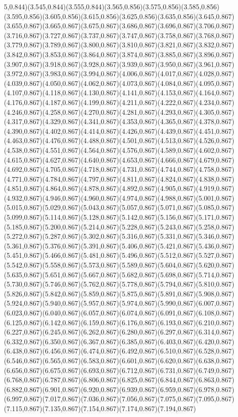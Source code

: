 \documentclass[smallextended]{svjour3}
\begin{document}
5,0.844)(3.545,0.844)(3.555,0.844)(3.565,0.856)(3.575,0.856)(3.585,0.856)(3.595,0.856)(3.605,0.856)(3.615,0.856)(3.625,0.856)(3.635,0.856)(3.645,0.867)(3.655,0.867)(3.665,0.867)(3.675,0.867)(3.686,0.867)(3.696,0.867)(3.706,0.867)(3.716,0.867)(3.727,0.867)(3.737,0.867)(3.747,0.867)(3.758,0.867)(3.768,0.867)(3.779,0.867)(3.789,0.867)(3.800,0.867)(3.810,0.867)(3.821,0.867)(3.832,0.867)(3.842,0.867)(3.853,0.867)(3.864,0.867)(3.874,0.867)(3.885,0.867)(3.896,0.867)(3.907,0.867)(3.918,0.867)(3.928,0.867)(3.939,0.867)(3.950,0.867)(3.961,0.867)(3.972,0.867)(3.983,0.867)(3.994,0.867)(4.006,0.867)(4.017,0.867)(4.028,0.867)(4.039,0.867)(4.050,0.867)(4.062,0.867)(4.073,0.867)(4.084,0.867)(4.095,0.867)(4.107,0.867)(4.118,0.867)(4.130,0.867)(4.141,0.867)(4.153,0.867)(4.164,0.867)(4.176,0.867)(4.187,0.867)(4.199,0.867)(4.211,0.867)(4.222,0.867)(4.234,0.867)(4.246,0.867)(4.258,0.867)(4.270,0.867)(4.281,0.867)(4.293,0.867)(4.305,0.867)(4.317,0.867)(4.329,0.867)(4.341,0.867)(4.353,0.867)(4.365,0.867)(4.378,0.867)(4.390,0.867)(4.402,0.867)(4.414,0.867)(4.426,0.867)(4.439,0.867)(4.451,0.867)(4.463,0.867)(4.476,0.867)(4.488,0.867)(4.501,0.867)(4.513,0.867)(4.526,0.867)(4.538,0.867)(4.551,0.867)(4.564,0.867)(4.576,0.867)(4.589,0.867)(4.602,0.867)(4.615,0.867)(4.627,0.867)(4.640,0.867)(4.653,0.867)(4.666,0.867)(4.679,0.867)(4.692,0.867)(4.705,0.867)(4.718,0.867)(4.731,0.867)(4.744,0.867)(4.758,0.867)(4.771,0.867)(4.784,0.867)(4.797,0.867)(4.811,0.867)(4.824,0.867)(4.838,0.867)(4.851,0.867)(4.864,0.867)(4.878,0.867)(4.892,0.867)(4.905,0.867)(4.919,0.867)(4.932,0.867)(4.946,0.867)(4.960,0.867)(4.974,0.867)(4.988,0.867)(5.001,0.867)(5.015,0.867)(5.029,0.867)(5.043,0.867)(5.057,0.867)(5.071,0.867)(5.085,0.867)(5.099,0.867)(5.114,0.867)(5.128,0.867)(5.142,0.867)(5.156,0.867)(5.171,0.867)(5.185,0.867)(5.200,0.867)(5.214,0.867)(5.228,0.867)(5.243,0.867)(5.258,0.867)(5.272,0.867)(5.287,0.867)(5.302,0.867)(5.316,0.867)(5.331,0.867)(5.346,0.867)(5.361,0.867)(5.376,0.867)(5.391,0.867)(5.406,0.867)(5.421,0.867)(5.436,0.867)(5.451,0.867)(5.466,0.867)(5.481,0.867)(5.496,0.867)(5.512,0.867)(5.527,0.867)(5.542,0.867)(5.558,0.867)(5.573,0.867)(5.589,0.867)(5.604,0.867)(5.620,0.867)(5.635,0.867)(5.651,0.867)(5.667,0.867)(5.682,0.867)(5.698,0.867)(5.714,0.867)(5.730,0.867)(5.746,0.867)(5.762,0.867)(5.778,0.867)(5.794,0.867)(5.810,0.867)(5.826,0.867)(5.842,0.867)(5.859,0.867)(5.875,0.867)(5.891,0.867)(5.908,0.867)(5.924,0.867)(5.940,0.867)(5.957,0.867)(5.974,0.867)(5.990,0.867)(6.007,0.867)(6.023,0.867)(6.040,0.867)(6.057,0.867)(6.074,0.867)(6.091,0.867)(6.108,0.867)(6.125,0.867)(6.142,0.867)(6.159,0.867)(6.176,0.867)(6.193,0.867)(6.210,0.867)(6.227,0.867)(6.245,0.867)(6.262,0.867)(6.280,0.867)(6.297,0.867)(6.314,0.867)(6.332,0.867)(6.350,0.867)(6.367,0.867)(6.385,0.867)(6.403,0.867)(6.420,0.867)(6.438,0.867)(6.456,0.867)(6.474,0.867)(6.492,0.867)(6.510,0.867)(6.528,0.867)(6.546,0.867)(6.565,0.867)(6.583,0.867)(6.601,0.867)(6.620,0.867)(6.638,0.867)(6.656,0.867)(6.675,0.867)(6.693,0.867)(6.712,0.867)(6.731,0.867)(6.749,0.867)(6.768,0.867)(6.787,0.867)(6.806,0.867)(6.825,0.867)(6.844,0.867)(6.863,0.867)(6.882,0.867)(6.901,0.867)(6.920,0.867)(6.939,0.867)(6.959,0.867)(6.978,0.867)(6.997,0.867)(7.017,0.867)(7.036,0.867)(7.056,0.867)(7.075,0.867)(7.095,0.867)(7.115,0.867)(7.135,0.867)(7.154,0.867)(7.174,0.867)(7.194,0.867)
\end{document}

